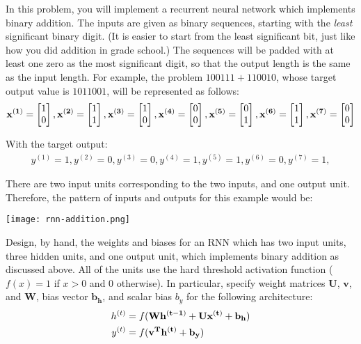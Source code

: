 \documentclass[
  letterpaper,
  DIV=11,
  numbers=noendperiod]{scrartcl}
\begin{document}
In this problem, you will implement a recurrent neural network which
implements binary addition. The inputs are given as binary sequences,
starting with the \emph{least} significant binary digit. (It is easier
to start from the least significant bit, just like how you did addition
in grade school.) The sequences will be padded with at least one zero as
the most significant digit, so that the output length is the same as the
input length. For example, the problem \(100111 + 110010\), whose target
output value is \(1011001\), will be represented as follows:
\begin{align*}
\bf{x}^{(1)} = \begin{bmatrix}1 \\ 0\end{bmatrix},
\bf{x}^{(2)} = \begin{bmatrix}1 \\ 1\end{bmatrix},
\bf{x}^{(3)} = \begin{bmatrix}1 \\ 0\end{bmatrix},
\bf{x}^{(4)} = \begin{bmatrix}0 \\ 0\end{bmatrix},
\bf{x}^{(5)} = \begin{bmatrix}0 \\ 1\end{bmatrix},
\bf{x}^{(6)} = \begin{bmatrix}1 \\ 1\end{bmatrix},
\bf{x}^{(7)} = \begin{bmatrix}0 \\ 0\end{bmatrix}
\end{align*}

With the target output: \begin{align*}
y^{(1)} = 1,
y^{(2)} = 0,
y^{(3)} = 0,
y^{(4)} = 1,
y^{(5)} = 1,
y^{(6)} = 0,
y^{(7)} = 1,
\end{align*}

There are two input units corresponding to the two inputs, and one
output unit. Therefore, the pattern of inputs and outputs for this
example would be:

\texttt{[image: rnn-addition.png]}

Design, by hand, the weights and biases for an RNN which has two input
units, three hidden units, and one output unit, which implements binary
addition as discussed above. All of the units use the hard threshold
activation function (\(f(x) = 1\) if \(x > 0\) and \(0\) otherwise). In
particular, specify weight matrices \(\mathbf{U}\), \(\mathbf{v}\), and
\(\mathbf{W}\), bias vector \(\mathbf{b}_{\mathbf{h}}\), and scalar bias
\(b_y\) for the following architecture: \begin{align*}
h^{(t)} &= f(\bf{W}h^{(t-1)} + \bf{U}\bf{x}^{(t)} + \bf{b_h}) \\
y^{(t)} &= f(\bf{v}^T h^{(t)} + b_y)
\end{align*}
\end{document}
